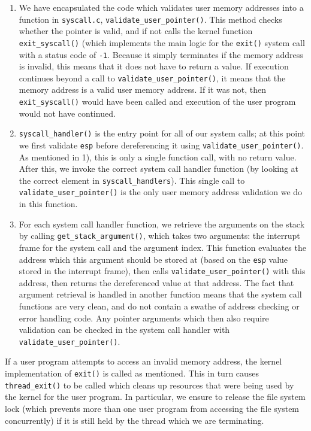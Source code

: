 \documentclass[a4wide, 11pt]{article}
\newcommand{\tx}{\texttt}
\begin{document}
\begin{enumerate}
\item We have encapsulated the code which validates user memory addresses into a function in \tx{syscall.c}, \tx{validate\_user\_pointer()}. This method checks whether the pointer is valid, and if not calls the kernel function \tx{exit\_syscall()} (which implements the main logic for the \tx{exit()} system call with a status code of \tx{-1}. Because it simply terminates if the memory address is invalid, this means that it does not have to return a value. If execution continues beyond a call to \tx{validate\_user\_pointer()}, it means that the memory address is a valid user memory address. If it was not, then \tx{exit\_syscall()} would have been called and execution of the user program would not have continued.
\item \tx{syscall\_handler()} is the entry point for all of our system calls; at this point we first validate \tx{esp} before dereferencing it using \tx{validate\_user\_pointer()}. As mentioned in 1), this is only a single function call, with no return value. After this, we invoke the correct system call handler function (by looking at the correct element in \tx{syscall\_handlers}). This single call to \tx{validate\_user\_pointer()} is the only user memory address validation we do in this function.
\item For each system call handler function, we retrieve the arguments on the stack by calling \tx{get\_stack\_argument()}, which takes two arguments: the interrupt frame for the system call and the argument index. This function evaluates the address which this argument should be stored at (based on the \tx{esp} value stored in the interrupt frame), then calls \tx{validate\_user\_pointer()} with this address, then returns the dereferenced value at that address. The fact that argument retrieval is handled in another function means that the system call functions are very clean, and do not contain a swathe of address checking or error handling code. Any pointer arguments which then also require validation can be checked in the system call handler with \tx{validate\_user\_pointer()}.
\end{enumerate}

If a user program attempts to access an invalid memory address, the kernel implementation of \tx{exit()} is called as mentioned. This in turn causes \tx{thread\_exit()} to be called which cleans up resources that were being used by the kernel for the user program. In particular, we ensure to release the file system lock (which prevents more than one user program from accessing the file system concurrently) if it is still held by the thread which we are terminating.
\end{document}
